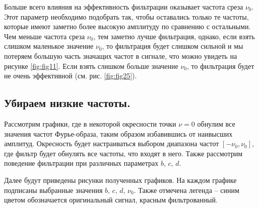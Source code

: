\documentclass[a4paper, 12pt]{article}
\begin{document}
    Больше всего влияния на эффективность фильтрации оказывает частота среза $\nu_0$. Этот параметр необходимо подобрать
    так, чтобы оставались только те частоты, которые имеют заметно более высокую амплитуду по сравнению с остальными.
    Чем меньше частота среза $\nu_0$, тем заметно лучше фильтрация, однако, если взять слишком маленькое значение $\nu_0$,
    то фильтрация будет слишком сильной и мы потеряем большую часть значащих частот в сигнале, что можно увидеть на рисунке
    \ref{fig:fig11}. Если взять слишком больше значение $\nu_0$, то фильтрация будет не очень эффективной (см. рис. \ref{fig:fig25}).


    \subsection{Убираем низкие частоты.}
    Рассмотрим графики, где в некоторой окресности точки $\nu=0$ обнулим все значения частот Фурье-образа, таким образом избавившись
    от наивысших амплитуд. Окресность будет настраиваться выбором диапазона частот $[-\nu_0,\nu_0]$, где фильтр будет обнулять все частоты, 
    что входят в него. Также рассмотрим поведение фильтрации при различных параметрах $b,\,c,\,d$.


    Далее будут приведены рисунки полученных графиков. На каждом графике подписаны выбранные значения $b,\,c,\,d,\,\nu_0$. 
    Также отмечена легенда -- синим цветом обозначается оригинальный сигнал, красным фильтрованный.
\end{document}
